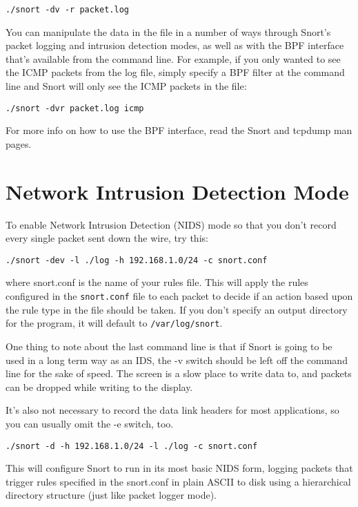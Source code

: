 \documentclass[english]{report}
\begin{document}
\begin{verbatim}
./snort -dv -r packet.log
\end{verbatim}
You can manipulate the data in the file in a number of ways through
Snort's packet logging and intrusion detection modes, as well as with
the BPF interface that's available from the command line. For example,
if you only wanted to see the ICMP packets from the log file, simply
specify a BPF filter at the command line and Snort will only see
the ICMP packets in the file:

\begin{verbatim}
./snort -dvr packet.log icmp 
\end{verbatim}
For more info on how to use the BPF interface, read the Snort and
tcpdump man pages.

\section{Network Intrusion Detection Mode}

To enable Network Intrusion Detection (NIDS) mode so that you don't
record every single packet sent down the wire, try this:

\begin{verbatim}
./snort -dev -l ./log -h 192.168.1.0/24 -c snort.conf
\end{verbatim}
where snort.conf is the name of your rules file. This will apply the
rules configured in the \verb!snort.conf! file to each packet to decide if an action
based upon the rule type in the file should be taken. If you don't
specify an output directory for the program, it will default to \verb!/var/log/snort!.

One thing to note about the last command line is that if Snort is
going to be used in a long term way as an IDS, the -v
switch should be left off the command line for the sake of speed.
The screen is a slow place to write data to, and packets can be dropped
while writing to the display.

It's also not necessary to record the data link headers for most applications,
so you can usually omit the -e switch, too.

\begin{verbatim}
./snort -d -h 192.168.1.0/24 -l ./log -c snort.conf
\end{verbatim}
This will configure Snort to run in its most basic NIDS form, logging
packets that trigger rules specified in the snort.conf in plain ASCII 
to disk using a hierarchical directory structure (just like packet logger mode). 
\end{document}
